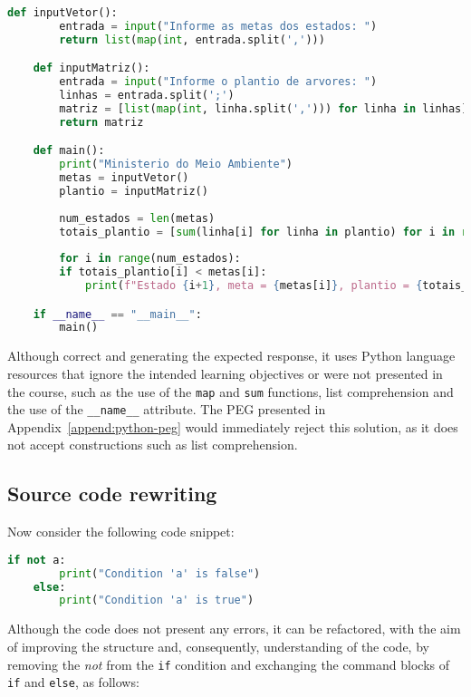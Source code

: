 \begin{lstlisting}[language=Python, breaklines]
    def inputVetor():
        entrada = input("Informe as metas dos estados: ")
        return list(map(int, entrada.split(',')))

    def inputMatriz():
        entrada = input("Informe o plantio de arvores: ")
        linhas = entrada.split(';')
        matriz = [list(map(int, linha.split(','))) for linha in linhas]
        return matriz

    def main():
        print("Ministerio do Meio Ambiente")
        metas = inputVetor()
        plantio = inputMatriz()
        
        num_estados = len(metas)
        totais_plantio = [sum(linha[i] for linha in plantio) for i in range(num_estados)]
        
        for i in range(num_estados):
        if totais_plantio[i] < metas[i]:
            print(f"Estado {i+1}, meta = {metas[i]}, plantio = {totais_plantio[i]}")

    if __name__ == "__main__":
        main()
\end{lstlisting}

Although correct and generating the expected response, it uses Python language 
resources that ignore the intended learning objectives or were not presented 
in the course, such as the use of the \texttt{map} and \texttt{sum} functions, 
list comprehension and the use of the \texttt{\_\_name\_\_} attribute.
The PEG presented in Appendix~\ref{append:python-peg} would immediately reject 
this solution, as it does not accept constructions such as list comprehension.


\subsection{Source code rewriting}

Now consider the following code snippet:

\begin{lstlisting}[language=Python]
    if not a:
        print("Condition 'a' is false")
    else:
        print("Condition 'a' is true")
\end{lstlisting}

Although the code does not present any errors, it can be refactored, with the 
aim of improving the structure and, consequently, understanding of the code, by 
removing the \textit{not} from the \texttt{if} condition and exchanging the 
command blocks of \texttt{if} and \texttt{else}, as follows:

